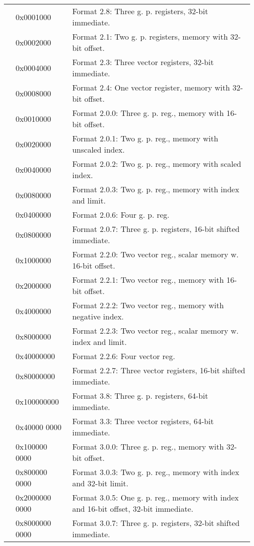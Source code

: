 \documentclass[forwardcom.tex]{subfiles}
\begin{document}
\begin{longtable} {|p{18mm}|p{20mm} p{80mm}|}
  &  0x0001000 & Format 2.8: Three g. p. registers, 32-bit immediate. \\
  &  0x0002000 & Format 2.1: Two g. p. registers, memory with 32-bit offset. \\
  &  0x0004000 & Format 2.3: Three vector registers, 32-bit immediate. \\
  &  0x0008000 & Format 2.4: One vector register, memory with 32-bit offset. \\
  
  &  0x0010000 & Format 2.0.0: Three g. p. reg., memory with 16-bit offset. \\
  &  0x0020000 & Format 2.0.1: Two g. p. reg., memory with unscaled index. \\
  &  0x0040000 & Format 2.0.2: Two g. p. reg., memory with scaled index. \\
  &  0x0080000 & Format 2.0.3: Two g. p. reg., memory with index and limit.\\  
  &  0x0400000 & Format 2.0.6: Four g. p. reg.\\
  &  0x0800000 & Format 2.0.7: Three g. p. registers, 16-bit shifted immediate. \\  

  &  0x1000000 & Format 2.2.0: Two vector reg., scalar memory w. 16-bit offset. \\
  &  0x2000000 & Format 2.2.1: Two vector reg., memory with 16-bit offset. \\
  &  0x4000000 & Format 2.2.2: Two vector reg., memory with negative index. \\
  &  0x8000000 & Format 2.2.3: Two vector reg., scalar memory w. index and limit. \\
  & 0x40000000 & Format 2.2.6: Four vector reg. \\
  & 0x80000000 & Format 2.2.7: Three vector registers, 16-bit shifted immediate.\\
  
  & 0x100000000 & Format 3.8:   Three g. p. registers, 64-bit immediate. \\
  & 0x40000 0000 & Format 3.3:   Three vector registers, 64-bit immediate. \\
 
  &  0x100000 0000 & Format 3.0.0: Three g. p. reg., memory with 32-bit offset. \\
  &  0x800000 0000 & Format 3.0.3: Two g. p. reg., memory with index and 32-bit limit.\\  
  &  0x2000000 0000 & Format 3.0.5: One g. p. reg., memory with index and 16-bit offset, 32-bit immediate.\\  
  &  0x8000000 0000 & Format 3.0.7: Three g. p. registers, 32-bit shifted immediate. \\  


\end{longtable}
\end{document}
